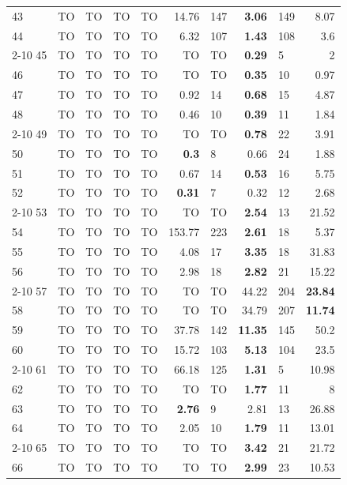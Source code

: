 \begin{longtable}{lr@{\hskip 4pt}l@{\hskip 12pt}r@{\hskip 4pt}l@{\hskip 12pt}r@{\hskip 4pt}l@{\hskip 12pt}r@{\hskip 4pt}l@{\hskip 12pt}r}
43 & TO & TO & TO & TO & 14.76 & 147 & \textbf{3.06} & 149 & 8.07 \\
44 & TO & TO & TO & TO & 6.32 & 107 & \textbf{1.43} & 108 & 3.6 \\
\cmidrule{2-10}
45 & TO & TO & TO & TO & TO & TO & \textbf{0.29} & 5 & 2 \\
46 & TO & TO & TO & TO & TO & TO & \textbf{0.35} & 10 & 0.97 \\
47 & TO & TO & TO & TO & 0.92 & 14 & \textbf{0.68} & 15 & 4.87 \\
48 & TO & TO & TO & TO & 0.46 & 10 & \textbf{0.39} & 11 & 1.84 \\
\cmidrule{2-10}
49 & TO & TO & TO & TO & TO & TO & \textbf{0.78} & 22 & 3.91 \\
50 & TO & TO & TO & TO & \textbf{0.3} & 8 & 0.66 & 24 & 1.88 \\
51 & TO & TO & TO & TO & 0.67 & 14 & \textbf{0.53} & 16 & 5.75 \\
52 & TO & TO & TO & TO & \textbf{0.31} & 7 & 0.32 & 12 & 2.68 \\
\cmidrule{2-10}
53 & TO & TO & TO & TO & TO & TO & \textbf{2.54} & 13 & 21.52 \\
54 & TO & TO & TO & TO & 153.77 & 223 & \textbf{2.61} & 18 & 5.37 \\
55 & TO & TO & TO & TO & 4.08 & 17 & \textbf{3.35} & 18 & 31.83 \\
56 & TO & TO & TO & TO & 2.98 & 18 & \textbf{2.82} & 21 & 15.22 \\
\cmidrule{2-10}
57 & TO & TO & TO & TO & TO & TO & 44.22 & 204 & \textbf{23.84} \\
58 & TO & TO & TO & TO & TO & TO & 34.79 & 207 & \textbf{11.74} \\
59 & TO & TO & TO & TO & 37.78 & 142 & \textbf{11.35} & 145 & 50.2 \\
60 & TO & TO & TO & TO & 15.72 & 103 & \textbf{5.13} & 104 & 23.5 \\
\cmidrule{2-10}
61 & TO & TO & TO & TO & 66.18 & 125 & \textbf{1.31} & 5 & 10.98 \\
62 & TO & TO & TO & TO & TO & TO & \textbf{1.77} & 11 & 8 \\
63 & TO & TO & TO & TO & \textbf{2.76} & 9 & 2.81 & 13 & 26.88 \\
64 & TO & TO & TO & TO & 2.05 & 10 & \textbf{1.79} & 11 & 13.01 \\
\cmidrule{2-10}
65 & TO & TO & TO & TO & TO & TO & \textbf{3.42} & 21 & 21.72 \\
66 & TO & TO & TO & TO & TO & TO & \textbf{2.99} & 23 & 10.53 \\

\end{longtable}
